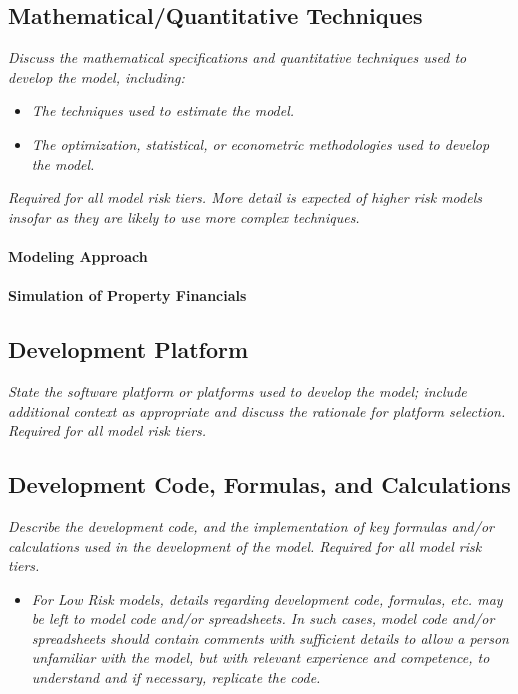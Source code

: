 \documentclass[12pt,letterpaper]{article}
\begin{document}
\subsection{Mathematical/Quantitative Techniques}
\textit{Discuss the mathematical specifications and quantitative techniques used to develop the model, including:}
\begin{itemize}
\item \textit{The techniques used to estimate the model.}
\item \textit{The optimization, statistical, or econometric methodologies used to develop the model.}
\end{itemize}
\textit{Required for all model risk tiers. More detail is expected of higher risk models insofar as they are likely to use more complex techniques.}

\paragraph{Modeling Approach}

\paragraph{Simulation of Property Financials}

\subsection{Development Platform}
\textit{State the software platform or platforms used to develop the model; include additional context as appropriate and discuss the rationale for platform selection. Required for all model risk tiers.}

\subsection{Development Code, Formulas, and Calculations}
\textit{Describe the development code, and the implementation of key formulas and/or calculations used in the development of the model. Required for all model risk tiers.}
\begin{itemize}
\item \textit{For Low Risk models, details regarding development code, formulas, etc. may be left to model code and/or spreadsheets. In such cases, model code and/or spreadsheets should contain comments with sufficient details to allow a person unfamiliar with the model, but with relevant experience and competence, to understand and if necessary, replicate the code.}
\end{itemize}
\end{document}
